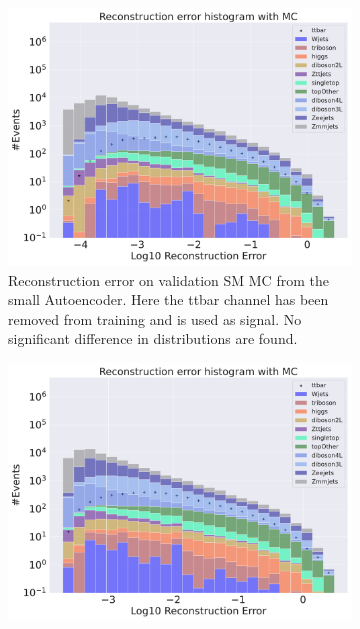 \begin{figure}[h!]
    \centering
    \begin{subfigure}{.45\textwidth}
        \includegraphics[width=\textwidth]{Figures/AE_testing/small/b_data_recon_big_rm3_feats_sig_ttbar.pdf}
        \caption{Reconstruction error on validation SM MC from the small Autoencoder. Here the ttbar channel has been removed from training and 
        is used as signal. No significant difference in distributions are found. }
        \label{fig:ae_small_ttbar}
    \end{subfigure}
    \hfill 
    \begin{subfigure}{.45\textwidth}
        \includegraphics[width=\textwidth]{Figures/AE_testing/big/b_data_recon_big_rm3_feats_sig_ttbar.pdf}

\end{subfigure}
\end{figure}
